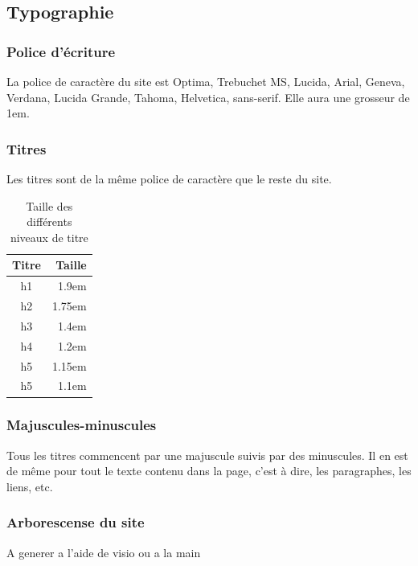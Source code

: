 \documentclass[letter, 11pt]{report}
\begin{document}
\subsection{Typographie}

\subsubsection{Police d’écriture}

La police de caractère du site est Optima, Trebuchet MS, Lucida, Arial, Geneva, Verdana, Lucida Grande, Tahoma, Helvetica, sans-serif. Elle aura une grosseur de 1em.

\subsubsection{Titres}
Les titres sont de la même police de caractère que le reste du site. 

\begin{table}
	\caption{Taille des différents niveaux de titre}
	\begin{center}
		\begin{tabular}{|c|r|}
			\hline
			Titre & Taille \\
			\hline
			h1    & 1.9em\\
			h2    & 1.75em\\
			h3    & 1.4em\\
			h4    & 1.2em\\
			h5    & 1.15em\\
			h5    & 1.1em\\
			\hline
		\end{tabular}
	\end{center}
\end{table}

\subsubsection{Majuscules-minuscules}

Tous les titres commencent par une majuscule suivis par des minuscules. Il en est de même pour tout le texte contenu dans la page, c'est à dire, les paragraphes, les liens, etc.

\subsubsection{Arborescense du site}

A generer a l'aide de visio ou a la main
\end{document}
